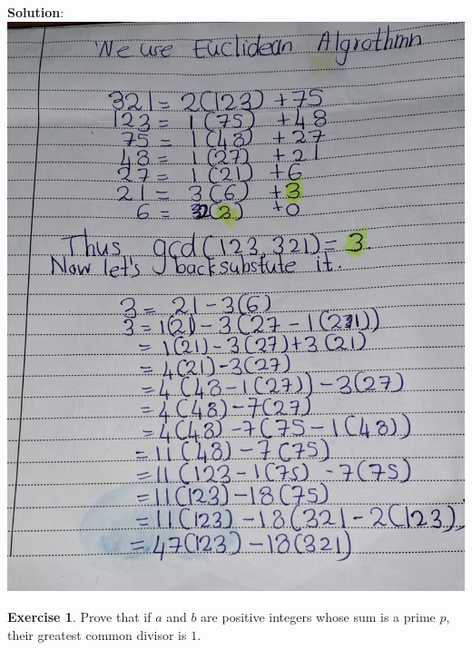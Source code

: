 \documentclass[
]{book}
\theoremstyle{definition}
\theoremstyle{definition}
\theoremstyle{definition}
\newtheorem{exercise}{Exercise}[chapter]
\theoremstyle{definition}
\theoremstyle{remark}
\begin{document}
\textbf{Solution}:
\includegraphics{figures/ch_2/fig20.jpg}

\begin{exercise}
\protect\hypertarget{exr:unnamed-chunk-54}{}\label{exr:unnamed-chunk-54}Prove that if \(a\) and \(b\) are positive integers whose sum is a prime \(p\), their greatest common
divisor is \(1\).
\end{exercise}
\end{document}
